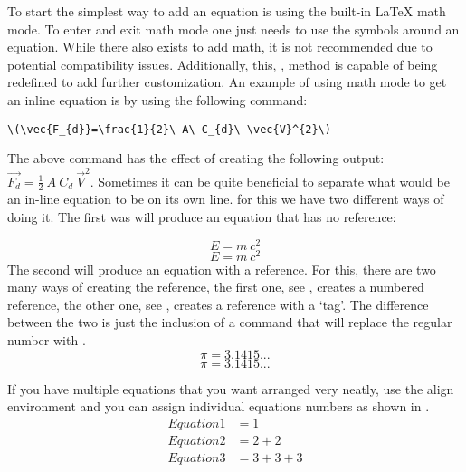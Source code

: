   To start the simplest way to add an equation is using the built-in \LaTeX{} math mode. 
  To enter and exit math mode one just needs to use the  symbols around an equation. While there also exists  to add math, it is not recommended due to potential compatibility issues. Additionally, this, , method is capable of being redefined to add further customization. 
  An example of using math mode to get an inline equation is by using the following command:
  
	\begin{Center}
		\lstinline|\(\vec{F_{d}}=\frac{1}{2}\ A\ C_{d}\ \vec{V}^{2}\)|
	\end{Center}
  
  The above command has the effect of creating the following output: \(\vec{F_{d}}=\frac{1}{2}\ A\ C_{d}\ \vec{V}^{2}\).
  Sometimes it can be quite beneficial to separate what would be an in-line equation to be on its own line. for this we have two different ways of doing it. The first was will produce an equation that has no reference:
  
  \[
    E = m\ c^2
  \] %
  \begin{equation*}
    E = m\ c^2
  \end{equation*}
  The second will produce an equation with a reference. For this, there are two many ways of creating the reference, the first one, see , creates a numbered reference, the other one, see , creates a reference with a `tag'. The difference between the two is just the inclusion of a  command that will replace the regular number with .
  \begin{equation}\label{eq:Eq}
    \pi = 3.1415...
  \end{equation}
  \begin{equation}\tag{Constant pi}\label{eq:customTag}
    \pi = 3.1415...
  \end{equation}
  
  If you have multiple equations that you want arranged very neatly, use the align environment and you can assign individual equations numbers as shown in .
  \begin{align}%
    \label{eq:multiref:a} Equation1 & = 1\\
    \label{eq:multiref:b} Equation2 & = 2 + 2\\
    \label{eq:multiref:c} Equation3 & = 3 + 3 + 3
  \end{align}
  
